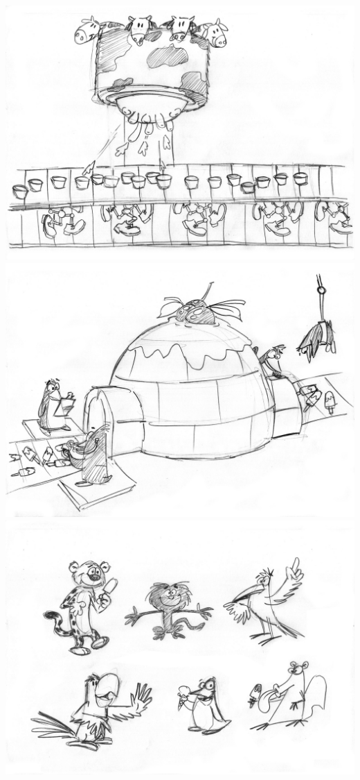 \documentclass{sigchi}
\begin{document}
\begin{center}
		\includegraphics[width=0.9\columnwidth]{04}
		\includegraphics[width=0.9\columnwidth]{05}
		\includegraphics[width=0.9\columnwidth]{06}
	\end{center}
\end{document}
